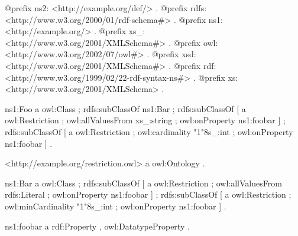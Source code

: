\begin{DoxyCodeInclude}
@prefix ns2:     <http://example.org/def/> .
@prefix rdfs:    <http://www.w3.org/2000/01/rdf-schema#> .
@prefix ns1:     <http://example.org/> .
@prefix xs_:     <http://www.w3.org/2001/XMLSchema#> .
@prefix owl:     <http://www.w3.org/2002/07/owl#> .
@prefix xsd:     <http://www.w3.org/2001/XMLSchema#> .
@prefix rdf:     <http://www.w3.org/1999/02/22-rdf-syntax-ns#> .
@prefix xs:      <http://www.w3.org/2001/XMLSchema> .

ns1:Foo
      a       owl:Class ;
      rdfs:subClassOf ns1:Bar ;
      rdfs:subClassOf
              [ a       owl:Restriction ;
                owl:allValuesFrom xs_:string ;
                owl:onProperty ns1:foobar
              ] ;
      rdfs:subClassOf
              [ a       owl:Restriction ;
                owl:cardinality "1"^^xs_:int ;
                owl:onProperty ns1:foobar
              ] .

<http://example.org/restriction.owl>
      a       owl:Ontology .

ns1:Bar
      a       owl:Class ;
      rdfs:subClassOf
              [ a       owl:Restriction ;
                owl:allValuesFrom rdfs:Literal ;
                owl:onProperty ns1:foobar
              ] ;
      rdfs:subClassOf
              [ a       owl:Restriction ;
                owl:minCardinality "1"^^xs_:int ;
                owl:onProperty ns1:foobar
              ] .

ns1:foobar
      a       rdf:Property , owl:DatatypeProperty .
\end{DoxyCodeInclude}
 